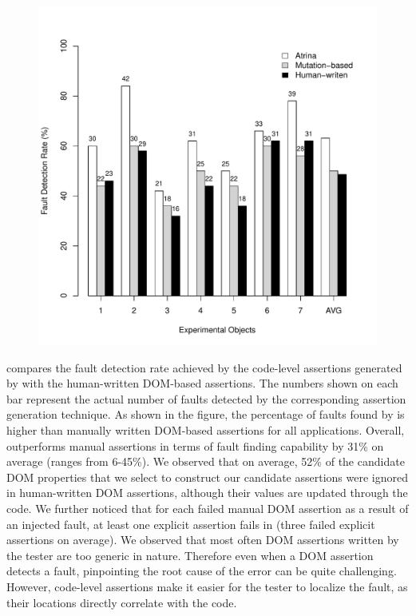 \begin{figure}[!t]
  \centering
  \includegraphics[width=0.7\hsize]{r-scripts/barplot-faultDetectionRate}
  \vspace{0.2in}   
  \label{Fig:barplot-faultDetectionRate}
\end{figure}
 compares the fault detection rate achieved by the code-level assertions generated by \atrina with the human-written DOM-based assertions. The numbers shown on each bar represent the actual number of faults detected by the corresponding assertion generation technique. As shown in the figure, the percentage of faults found by \atrina is higher than manually written DOM-based assertions for all applications. Overall, \atrina outperforms manual assertions in terms of fault finding capability by 31\% on average (ranges from 6-45\%). We observed that on average, 52\% of the candidate DOM properties that we select to construct our candidate assertions were ignored in human-written DOM assertions, although their values are updated through the \javascript code.
We further noticed that for each failed manual DOM assertion as a result of an injected fault, at least one explicit assertion fails in \atrina (three failed explicit assertions on average).
We observed that most often DOM assertions written by the tester are too generic in nature. Therefore even when a DOM assertion detects a \javascript fault, pinpointing the root cause of the error can be quite challenging. However, code-level assertions make it easier for the tester to localize the fault, as their locations directly correlate with the code.

